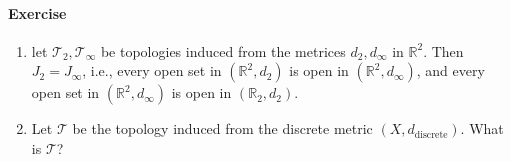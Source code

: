 \paragraph{Exercise}
\begin{enumerate}
\item
let $\mathcal{T}_2,\mathcal{T}_\infty$ be topologies induced from the metrices $d_2,d_\infty$ in $\mathbb{R}^2$. Then $J_2=J_\infty$, i.e., every open set in $(\mathbb{R}^2,d_2)$ is open in $(\mathbb{R}^2,d_\infty)$, and every open set in $(\mathbb{R}^2,d_\infty)$ is open in $(\mathbb{R}_2,d_2)$.
\item
Let $\mathcal{T}$ be the topology induced from the discrete metric $(X,d_{\text{discrete}}).$ What is $\mathcal{T}$?
\end{enumerate}













